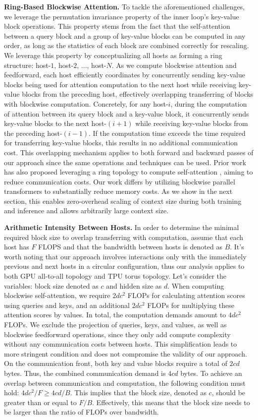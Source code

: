 \textbf{Ring-Based Blockwise Attention.} To tackle the aforementioned challenges, we leverage the permutation invariance property of the inner loop's key-value block operations. This property stems from the fact that the self-attention between a query block and a group of key-value blocks can be computed in any order, as long as the statistics of each block are combined correctly for rescaling. We leverage this property by conceptualizing all hosts as forming a ring structure: host-$1$, host-$2$, ..., host-$N$. As we compute blockwise attention and feedforward, each host efficiently coordinates by concurrently sending key-value blocks being used for attention computation to the next host while receiving key-value blocks from the preceding host, effectively overlapping transferring of blocks with blockwise computation. Concretely, for any host-$i$, during the computation of attention between its query block and a key-value block, it concurrently sends key-value blocks to the next host-$(i+1)$ while receiving key-value blocks from the preceding host-$(i-1)$. If the computation time exceeds the time required for transferring key-value blocks, this results in no additional communication cost. This overlapping mechanism applies to both forward and backward passes of our approach since the same operations and techniques can be used. Prior work has also proposed leveraging a ring topology to compute self-attention \citep{li2021sequence}, aiming to reduce communication costs. Our work differs by utilizing blockwise parallel transformers to substantially reduce memory costs. As we show in the next section, this enables zero-overhead scaling of context size during both training and inference and allows arbitrarily large context size.

\textbf{Arithmetic Intensity Between Hosts.} In order to determine the minimal required block size to overlap transferring with computation, assume that each host has $F$ FLOPS and that the bandwidth between hosts is denoted as $B$. It's worth noting that our approach involves interactions only with the immediately previous and next hosts in a circular configuration, thus our analysis applies to both GPU all-to-all topology and TPU torus topology. Let's consider the variables: block size denoted as $c$ and hidden size as $d$. When computing blockwise self-attention, we require $2dc^2$ FLOPs for calculating attention scores using queries and keys, and an additional $2dc^2$ FLOPs for multiplying these attention scores by values. In total, the computation demands amount to $4dc^2$ FLOPs. We exclude the projection of queries, keys, and values, as well as blockwise feedforward operations, since they only add compute complexity without any communication costs between hosts. This simplification leads to more stringent condition and does not compromise the validity of our approach. On the communication front, both key and value blocks require a total of $2cd$ bytes. Thus, the combined communication demand is $4cd$ bytes. To achieve an overlap between communication and computation, the following condition must hold: $4dc^2 / F \geq 4cd / B$. This implies that the block size, denoted as $c$, should be greater than or equal to $F/B$. Effectively, this means that the block size needs to be larger than the ratio of FLOPs over bandwidth.


